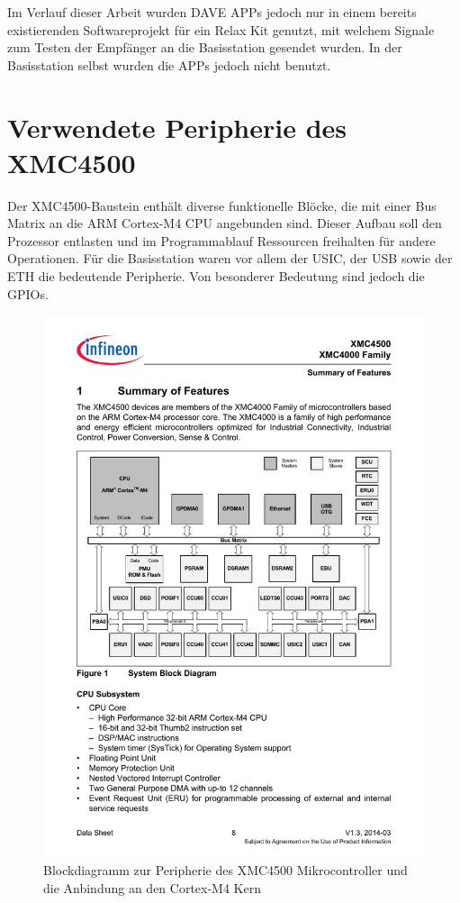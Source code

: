 Im Verlauf dieser Arbeit wurden DAVE  APPs jedoch nur in einem bereits existierenden Softwareprojekt für ein Relax Kit genutzt, mit welchem  Signale zum Testen der Empfänger an die Basisstation gesendet wurden. In der Basisstation selbst wurden die APPs jedoch nicht benutzt.


\section{Verwendete Peripherie des XMC4500}


Der XMC4500-Baustein enthält diverse funktionelle Blöcke, die mit einer Bus Matrix an die ARM Cortex-M4 \ac{CPU} angebunden sind. Dieser Aufbau soll den Prozessor entlasten und im Programmablauf Ressourcen freihalten für andere Operationen.
Für die Basisstation waren vor allem der \acs{USIC}, der \ac{USB} sowie der \ac{ETH} die bedeutende Peripherie. Von besonderer Bedeutung sind jedoch die \acp{GPIO}.
\begin{figure}[h]
\centering
\includegraphics[width=0.7\linewidth]{Abbildungen/XMCBlockdiagram}
\caption{Blockdiagramm zur Peripherie des XMC4500 Mikrocontroller und die Anbindung an den Cortex-M4 Kern \cite{XMC-DataSheet}}
\label{fig:xmcblockdiagram}
\end{figure}






